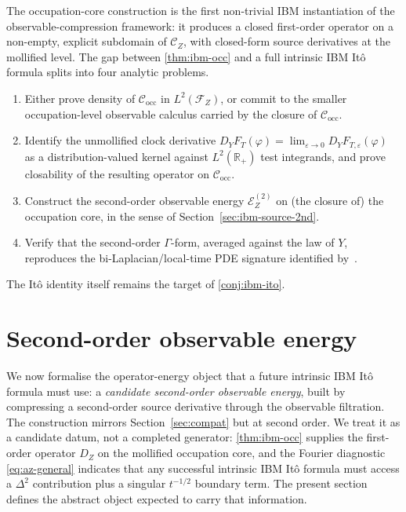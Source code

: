 \documentclass[11pt,reqno]{amsart}
\theoremstyle{plain}
\theoremstyle{definition}
\theoremstyle{remark}
\newcommand{\R}{\mathbb{R}}
\newcommand{\Energy}{\mathcal{E}}
\newcommand{\IBM}{Z}
\newcommand{\Carre}{\Gamma}
\begin{document}
The occupation-core construction is the first non-trivial IBM
instantiation of the observable-compression framework: it produces a
closed first-order operator on a non-empty, explicit subdomain of
$\mathcal C_\IBM$, with closed-form source derivatives at the mollified
level. The gap between \cref{thm:ibm-occ} and a full intrinsic IBM
It\^o formula splits into four analytic problems.
\begin{enumerate}
\item Either prove density of $\mathcal C_{\mathrm{occ}}$ in
  $L^{2}(\mathcal F_\IBM)$, or commit to the smaller occupation-level
  observable calculus carried by the closure of
  $\mathcal C_{\mathrm{occ}}$.
\item Identify the unmollified clock derivative
  $D_Y F_T(\varphi)=\lim_{\varepsilon\to 0}D_Y F_{T,\varepsilon}(\varphi)$
  as a distribution-valued kernel against $L^{2}(\R_{+})$ test
  integrands, and prove closability of the resulting operator on
  $\mathcal C_{\mathrm{occ}}$.
\item Construct the second-order observable energy
  $\Energy_\IBM^{(2)}$ on (the closure of) the occupation core, in the
  sense of Section~\ref{sec:ibm-source-2nd}.
\item Verify that the second-order $\Carre$-form, averaged against the
  law of $Y$, reproduces the bi-Laplacian/local-time PDE signature
  identified by~\cite{AllouZheng}.
\end{enumerate}
The It\^o identity itself remains the target of \cref{conj:ibm-ito}.

\section{Second-order observable energy}\label{sec:second-order}

We now formalise the operator-energy object that a future intrinsic
IBM It\^o formula must use: a \emph{candidate second-order observable
energy}, built by compressing a second-order source derivative through
the observable filtration. The construction mirrors
Section~\ref{sec:compat} but at second order. We treat it as a
candidate datum, not a completed generator: \cref{thm:ibm-occ}
supplies the first-order operator $D_\IBM$ on the mollified occupation
core, and the Fourier diagnostic \eqref{eq:az-general} indicates that
any successful intrinsic IBM It\^o formula must access a $\Delta^{2}$
contribution plus a singular $t^{-1/2}$ boundary term. The present
section defines the abstract object expected to carry that
information.
\end{document}
